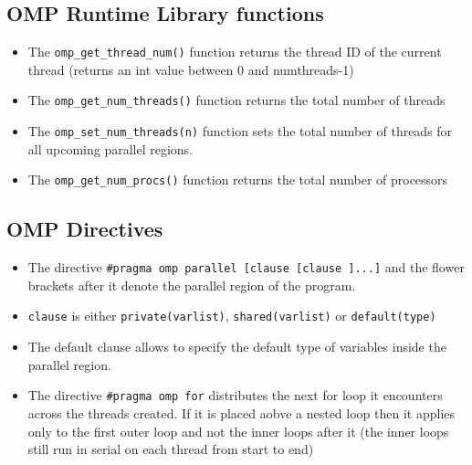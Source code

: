\documentclass{article}
\begin{document}
\subsection{OMP Runtime Library functions}
\begin{itemize}
    \item The \texttt{omp\_get\_thread\_num()} function returns the thread ID of the current thread (returns an int value between 0 and numthreads-1)
    
    \item The \texttt{omp\_get\_num\_threads()} function returns the total number of threads 
    
    \item The \texttt{omp\_set\_num\_threads(n)} function sets the total number of threads for all upcoming parallel regions. 
    
    \item The \texttt{omp\_get\_num\_procs()} function returns the total number of processors
\end{itemize}

\subsection{OMP Directives}
\begin{itemize}
    
    \item The directive \texttt{\#pragma omp parallel [clause [clause ]...]} and the flower brackets after it denote the parallel region of the program.
    
    \item \texttt{clause} is either \texttt{private(varlist)}, \texttt{shared(varlist)} or \texttt{default(type)}
    
    \item The default clause allows to specify the default type of variables inside the parallel region. 
    
    \item The directive \texttt{\#pragma omp for} distributes the next for loop it encounters across the threads created. If it is placed aobve a nested loop then it applies only to the first outer loop and not the inner loops after it (the inner loops still run in serial on each thread from start to end)
\end{itemize}
\end{document}
